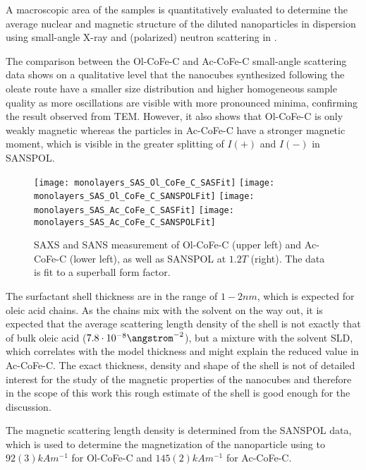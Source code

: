 A macroscopic area of the samples is quantitatively evaluated to determine the average nuclear and magnetic structure of the diluted nanoparticles in dispersion using small-angle X-ray and (polarized) neutron scattering in .

The comparison between the Ol-CoFe-C and Ac-CoFe-C small-angle scattering data shows on a qualitative level that the nanocubes synthesized following the oleate route have a smaller size distribution and higher homogeneous sample quality as more oscillations are visible with more pronounced minima, confirming the result observed from TEM.
However, it also shows that Ol-CoFe-C is only weakly magnetic whereas the particles in Ac-CoFe-C have a stronger magnetic moment, which is visible in the greater splitting of $I(+)$ and $I(-)$ in SANSPOL.

\begin{figure}[tb]
  \centering
  \texttt{[image: monolayers\_SAS\_Ol\_CoFe\_C\_SASFit]}
  \texttt{[image: monolayers\_SAS\_Ol\_CoFe\_C\_SANSPOLFit]}
  \texttt{[image: monolayers\_SAS\_Ac\_CoFe\_C\_SASFit]}
  \texttt{[image: monolayers\_SAS\_Ac\_CoFe\_C\_SANSPOLFit]}
  \caption{\label{fig:monolayers:nanoparticle:sas:AcOlCoFeC}SAXS and SANS measurement of Ol-CoFe-C (upper left) and Ac-CoFe-C (lower left), as well as SANSPOL at $1.2 \unit{T}$ (right). The data is fit to a superball form factor.}
\end{figure}

The surfactant shell thickness are in the range of $1 - 2 \unit{nm}$, which is expected for oleic acid chains.
As the chains mix with the solvent on the way out, it is expected that the average scattering length density of the shell is not exactly that of bulk oleic acid ($7.8 \cdot 10^{-8} \angstrom^{-2}$), but a mixture with the solvent SLD, which correlates with the model thickness and might explain the reduced value in Ac-CoFe-C.
The exact thickness, density and shape of the shell is not of detailed interest for the study of the magnetic properties of the nanocubes and therefore in the scope of this work this rough estimate of the shell is good enough for the discussion.

The magnetic scattering length density is determined from the SANSPOL data, which is used to determine the magnetization of the nanoparticle using  to $92(3) \unit{kAm^{-1}}$ for Ol-CoFe-C and $145(2) \unit{kAm^{-1}}$ for Ac-CoFe-C.

